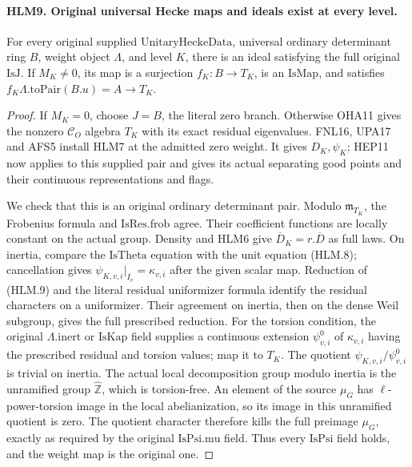 \paragraph{HLM9. Original universal Hecke maps and ideals exist at every level.}
\label{claim:HLM9}
For every original supplied \(\mathrm{UnitaryHeckeData}\),
universal ordinary determinant ring \(B\), weight object
\(\Lambda\), and level \(K\), there is an ideal satisfying
the full original \(\mathrm{IsJ}\).  If \(M_K\ne0\), its
map is a surjection \(f_K:B\to T_K\), is an
\(\mathrm{IsMap}\), and satisfies
\(f_K\Lambda.\mathrm{toPair}(B.u)=A\to T_K\).
\begin{proof}
If \(M_K=0\), choose \(J=B\), the literal zero branch.
Otherwise OHA11 gives the nonzero \(\mathcal C_O\) algebra
\(T_K\) with its exact residual eigenvalues.  FNL16,
UPA17 and AFS5 install HLM7 at the admitted zero weight.
It gives \(D_K,\psi_K\); HEP11 now applies to this supplied
pair and gives its actual separating good points and their
continuous representations and flags.

We check that this is an original ordinary determinant pair.
Modulo \(\mathfrak m_{T_K}\), the Frobenius formula and
\(\mathrm{IsRes.frob}\) agree.  Their coefficient functions
are locally constant on the actual group.  Density and HLM6
give \(\overline D_K=r.\overline D\) as full laws.
On inertia, compare the \(\mathrm{IsTheta}\) equation with
the unit equation (HLM.8); cancellation gives
\(\psi_{K,v,i}|_{I_v}=\kappa_{v,i}\) after the given
scalar map.  Reduction of (HLM.9) and the literal residual
uniformizer formula identify the residual characters on a
uniformizer.  Their agreement on inertia, then on the dense
Weil subgroup, gives the full prescribed reduction.  For the
torsion condition, the original \(\Lambda.\mathrm{inert}\)
or \(\mathrm{IsKap}\) field supplies a continuous extension
\(\psi^0_{v,i}\) of \(\kappa_{v,i}\) having the prescribed
residual and torsion values; map it to \(T_K\).  The quotient
\(\psi_{K,v,i}/\psi^0_{v,i}\) is trivial on inertia.
The actual local decomposition group modulo inertia is the
unramified group \(\widehat{\mathbb Z}\), which is
torsion-free.  An element of the source \(\mu_G\) has
\(\ell\)-power-torsion image in the local abelianization,
so its image in this unramified quotient is zero.  The
quotient character therefore kills the full preimage
\(\mu_G\), exactly as required by the original
\(\mathrm{IsPsi.mu}\) field.  Thus every \(\mathrm{IsPsi}\) field
holds, and the weight map is the original one.


\end{proof}
